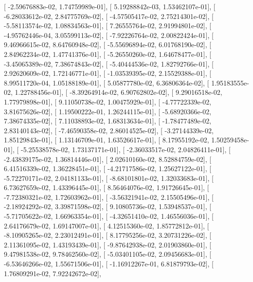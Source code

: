 \documentclass{article}
\begin{document}
       [ -2.59676883e-02,   1.74759989e-01],
       [  5.19288842e-03,   1.53462107e-01],
       [ -6.28033612e-02,   2.84775769e-02],
       [ -4.57505417e-02,   2.75214301e-02],
       [ -5.58113574e-02,   1.08834563e-01],
       [  7.26555764e-02,   2.91994801e-02],
       [ -4.95762446e-04,   3.05599113e-02],
       [ -7.92226764e-02,   2.00822424e-01],
       [  9.46966615e-02,   8.64760948e-02],
       [ -5.55696894e-02,   6.01768190e-02],
       [  2.84962234e-02,   1.47741376e-01],
       [ -5.26550260e-02,   1.64678477e-01],
       [ -3.45065389e-02,   7.38674843e-02],
       [ -5.40444536e-02,   1.82792766e-01],
       [  2.92620609e-02,   1.72146771e-01],
       [ -1.03539395e-02,   2.15529388e-01],
       [  8.99511720e-04,   1.05188189e-01],
       [  5.05877780e-02,   6.36806364e-02],
       [  1.95183555e-02,   1.22788456e-01],
       [ -8.39264914e-02,   6.90762802e-02],
       [  9.29016518e-02,   1.77979898e-01],
       [  9.11050738e-02,   1.00475929e-01],
       [ -4.77722339e-02,   3.81675626e-02],
       [  1.19500222e-01,   1.26244115e-01],
       [ -5.68920366e-02,   7.38674335e-02],
       [  7.11038893e-02,   1.68313634e-01],
       [ -1.78477489e-02,   2.83140143e-02],
       [ -7.46590358e-02,   2.86014525e-02],
       [ -3.27144339e-02,   1.85129843e-01],
       [  1.13146709e-01,   1.63526617e-01],
       [  8.17955192e-02,   1.50259458e-01],
       [ -5.25538578e-02,   1.73137171e-01],
       [ -2.36033517e-02,   2.04826411e-01],
       [ -2.43839175e-02,   1.36814446e-01],
       [  2.02610160e-02,   8.52884759e-02],
       [  6.41516339e-02,   1.36228451e-01],
       [ -4.21717586e-02,   1.25627122e-01],
       [ -5.72270171e-02,   2.04181133e-01],
       [ -8.68101801e-02,   1.32033683e-01],
       [  6.73627659e-02,   1.43396445e-01],
       [  8.56464076e-02,   1.91726645e-01],
       [ -7.72380321e-02,   1.72603962e-01],
       [ -3.56321941e-02,   2.15505496e-01],
       [ -2.18924292e-02,   3.39871598e-02],
       [  9.10805736e-02,   1.53948537e-01],
       [ -5.71705622e-02,   1.66963354e-01],
       [ -4.32651410e-02,   1.46556036e-01],
       [  2.64176679e-02,   1.69147007e-01],
       [  4.12515360e-02,   1.85772812e-01],
       [ -8.10905265e-02,   2.23012491e-01],
       [  8.17795256e-02,   3.20731226e-02],
       [  2.11361095e-02,   1.43193439e-01],
       [ -9.87642938e-02,   2.01903860e-01],
       [  9.47981538e-02,   9.78462560e-02],
       [ -5.03401105e-02,   2.09456683e-01],
       [ -6.53646266e-02,   1.55671506e-01],
       [ -1.16912267e-01,   6.81879793e-02],
       [  1.76809291e-02,   7.92242672e-02],
\end{document}
